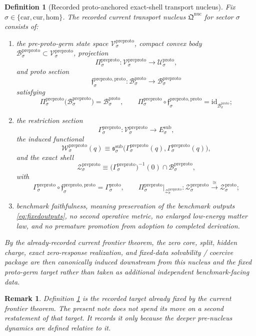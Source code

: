 \documentclass[11pt]{article}
\newcommand{\Car}{\mathrm{car}}
\newcommand{\Cur}{\mathrm{cur}}
\newcommand{\Hom}{\mathrm{hom}}
\newcommand{\SubTarget}[1]{E_{#1}^{\mathrm{sub}}}
\newcommand{\SubPair}[1]{\mathfrak s_{#1}^{\mathrm{sub}}}
\newcommand{\ProtoSpace}[1]{\mathcal U_{#1}^{\mathrm{proto}}}
\newcommand{\ProtoBody}[1]{\mathcal B_{#1}^{\mathrm{proto}}}
\newcommand{\ProtoSection}[1]{\Gamma_{#1}^{\mathrm{proto}}}
\newcommand{\ProtoShellSet}[1]{\mathcal Z_{#1}^{\mathrm{proto}}}
\newcommand{\PreProtoNucleus}{\mathfrak Q^{\mathrm{nuc}}}
\newcommand{\PreProtoSpace}[1]{\mathcal V_{#1}^{\mathrm{preproto}}}
\newcommand{\PreProtoBody}[1]{\mathcal B_{#1}^{\mathrm{preproto}}}
\newcommand{\PreProtoProj}[1]{\Pi_{#1}^{\mathrm{preproto}}}
\newcommand{\PreProtoProtoMin}[1]{\mathfrak f_{#1}^{\mathrm{preproto,proto}}}
\newcommand{\PreProtoSection}[1]{\Gamma_{#1}^{\mathrm{preproto}}}
\newcommand{\PreProtoFunctional}[1]{\mathscr W_{#1}^{\mathrm{preproto}}}
\newcommand{\PreProtoShellSet}[1]{\mathcal Z_{#1}^{\mathrm{preproto}}}
\newtheorem{definition}{Definition}
\newtheorem{remark}{Remark}
\begin{document}
\begin{definition}[Recorded proto-anchored exact-shell transport nucleus]
\label{def:nucleus}
Fix \(\sigma\in\{\Car,\Cur,\Hom\}\). The recorded current transport nucleus \(\PreProtoNucleus\) for sector \(\sigma\) consists of:
\begin{enumerate}
    \item the pre-proto-germ state space \(\PreProtoSpace{\sigma}\), compact convex body \(\PreProtoBody{\sigma}\subset\PreProtoSpace{\sigma}\), projection
    \[
    \PreProtoProj{\sigma}:\PreProtoSpace{\sigma}\to\ProtoSpace{\sigma},
    \]
    and proto section
    \[
    \PreProtoProtoMin{\sigma}:\ProtoBody{\sigma}\to\PreProtoBody{\sigma}
    \]
    satisfying
    \[
    \PreProtoProj{\sigma}\bigl(\PreProtoBody{\sigma}\bigr)=\ProtoBody{\sigma},
    \qquad
    \PreProtoProj{\sigma}\circ\PreProtoProtoMin{\sigma}
    =
    \mathrm{id}_{\ProtoBody{\sigma}};
    \]
    \item the restriction section
    \[
    \PreProtoSection{\sigma}:\PreProtoSpace{\sigma}\to\SubTarget{\sigma},
    \]
    the induced functional
    \[
    \PreProtoFunctional{\sigma}(q)
    \equiv
    \SubPair{\sigma}\bigl(\PreProtoSection{\sigma}(q),\PreProtoSection{\sigma}(q)\bigr),
    \]
    and the exact shell
    \[
    \PreProtoShellSet{\sigma}
    \equiv
    \bigl(\PreProtoSection{\sigma}\bigr)^{-1}(0)\cap\PreProtoBody{\sigma},
    \]
    with
    \[
    \PreProtoSection{\sigma}\circ\PreProtoProtoMin{\sigma}
    =
    \ProtoSection{\sigma},
    \qquad
    \PreProtoProj{\sigma}\big|_{\PreProtoShellSet{\sigma}}
    :
    \PreProtoShellSet{\sigma}
    \xrightarrow{\cong}
    \ProtoShellSet{\sigma};
    \]
    \item benchmark faithfulness, meaning preservation of the benchmark outputs \eqref{eq:fixedoutputs}, no second operative metric, no enlarged low-energy matter law, and no premature promotion from adoption to completed derivation.
\end{enumerate}
By the already-recorded current frontier theorem, the zero core, split, hidden charge, exact zero-response realization, and fixed-data solvability / coercive package are then canonically induced downstream from this nucleus and the fixed proto-germ target rather than taken as additional independent benchmark-facing data.
\end{definition}

\begin{remark}
Definition \ref{def:nucleus} is the recorded target already fixed by the current frontier theorem. The present note does not spend its move on a second restatement of that target. It records it only because the deeper pre-nucleus dynamics are defined relative to it.
\end{remark}
\end{document}
